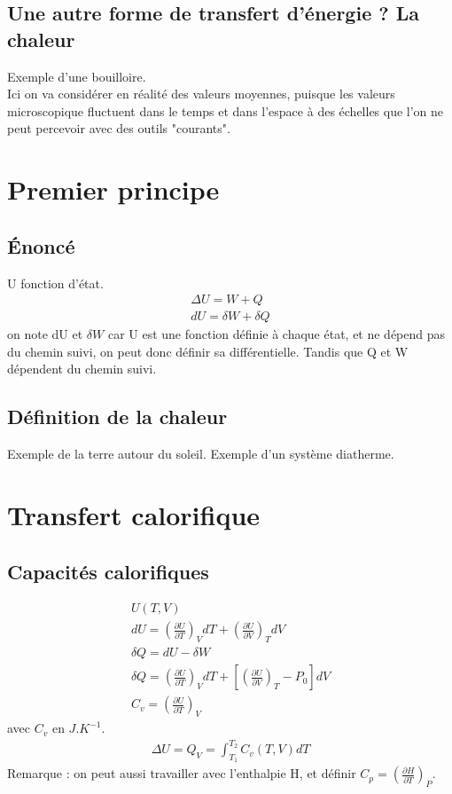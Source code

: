 \documentclass[12pt,prb,aps,epsf]{report}
\begin{document}
\subsection{Une autre forme de transfert d'énergie ? La chaleur}
Exemple d'une bouilloire.\\
Ici on va considérer en réalité des valeurs moyennes, puisque les valeurs microscopique fluctuent dans le temps et dans l'espace à des échelles que l'on ne peut percevoir avec des outils "courants".
\section{Premier principe}
\subsection{Énoncé}
U fonction d'état.
\begin{eqnarray}
\Delta U = W+Q\\dU = \delta W + \delta Q
\end{eqnarray}
on note dU et $\delta W$ car U est une fonction définie à chaque état, et ne dépend pas du chemin suivi, on peut donc définir sa différentielle. Tandis que Q et W dépendent du chemin suivi.
\subsection{Définition de la chaleur}
Exemple de la terre autour du soleil.
Exemple d'un système diatherme.
\section{Transfert calorifique}
\subsection{Capacités calorifiques}
\begin{eqnarray}
U(T,V)\\dU = \left(\frac{\partial U}{\partial T}\right)_VdT + \left(\frac{\partial U}{\partial V}\right)_TdV\\
\delta Q = dU - \delta W\\
\delta Q = \left(\frac{\partial U}{\partial T}\right)_VdT + \left[ \left(\frac{\partial U}{\partial V}\right)_T-P_0\right]dV\\
C_v = \left(\frac{\partial U}{\partial T}\right)_V
\end{eqnarray}
avec $C_v$ en $J.K^{-1}$.
\begin{eqnarray}
\Delta U = Q_V = \int_{T_1}^{T_2}C_v(T,V)dT
\end{eqnarray}
Remarque : on peut aussi travailler avec l'enthalpie H, et définir $C_p= \left(\frac{\partial H}{\partial T}\right)_P$.
\end{document}
